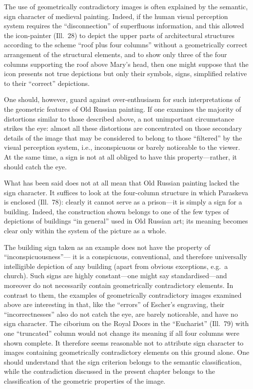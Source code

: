 The use of geometrically contradictory images is often explained by the semantic, sign
character of medieval painting.  Indeed, if the human visual perception system requires
the ``disconnection'' of superfluous information, and this allowed the icon-painter
(Ill.~28) to depict the upper parts of architectural structures according to the scheme
``roof plus four columns'' without a geometrically correct arrangement of the structural
elements, and to show only three of the four columns supporting the roof above Mary's
head, then one might suppose that the icon presents not true depictions but only their
symbols, signs, simplified relative to their ``correct'' depictions.


One should, however, guard against over-enthusiasm for such interpretations of the
geometric features of Old Russian painting.  If one examines the majority of distortions
similar to those described above, a not unimportant circumstance strikes the eye: almost
all these distortions are concentrated on those secondary details of the image that may
be considered to belong to those ``filtered'' by the visual perception system, i.e.,
inconspicuous or barely noticeable to the viewer.  At the same time, a sign is not at
all obliged to have this property---rather, it should catch the eye.

What has been said does not at all mean that Old Russian painting lacked the sign
character.  It suffices to look at the four-column structure in which Paraskeva is
enclosed (Ill.~78): clearly it cannot serve as a prison---it is simply a sign for a
building.  Indeed, the construction shown belongs to one of the few types of depictions
of buildings ``in general'' used in Old Russian art; its meaning becomes clear only within
the system of the picture as a whole.

The building sign taken as an example does not have the property of ``inconspicuousness''---
it is a conspicuous, conventional, and therefore universally intelligible depiction of any
building (apart from obvious exceptions, e.g.\ a church).  Such signs are highly
constant---one might say standardised---and moreover do not necessarily contain
geometrically contradictory elements.  In contrast to them, the examples of geometrically
contradictory images examined above are interesting in that, like the ``errors'' of
Escher's engraving, their ``incorrectnesses'' also do not catch the eye, are barely
noticeable, and have no sign character.  The ciborium on the Royal Doors in the
``Eucharist'' (Ill.~79) with one ``truncated'' column would not change its meaning if
all four columns were shown complete.  It therefore seems reasonable not to attribute
sign character to images containing geometrically contradictory elements on this ground
alone.  One should understand that the sign criterion belongs to the semantic
classification, while the contradiction discussed in the present chapter belongs to the
classification of the geometric properties of the image.

